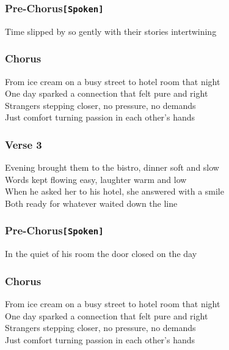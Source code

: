 \subsubsection{\texorpdfstring{Pre-Chorus\texttt{{[}Spoken{]}}}{Pre-Chorus{[}Spoken{]}}}\label{pre-chorusspoken}

Time slipped by so gently with their stories intertwining

\subsubsection{Chorus}\label{chorus-49}

From ice cream on a busy street to hotel room that night\\
One day sparked a connection that felt pure and right\\
Strangers stepping closer, no pressure, no demands\\
Just comfort turning passion in each other's hands

\subsubsection{Verse 3}\label{verse-3-11}

Evening brought them to the bistro, dinner soft and slow\\
Words kept flowing easy, laughter warm and low\\
When he asked her to his hotel, she answered with a smile\\
Both ready for whatever waited down the line

\subsubsection{\texorpdfstring{Pre-Chorus\texttt{{[}Spoken{]}}}{Pre-Chorus{[}Spoken{]}}}\label{pre-chorusspoken-1}

In the quiet of his room the door closed on the day

\subsubsection{Chorus}\label{chorus-50}

From ice cream on a busy street to hotel room that night\\
One day sparked a connection that felt pure and right\\
Strangers stepping closer, no pressure, no demands\\
Just comfort turning passion in each other's hands

